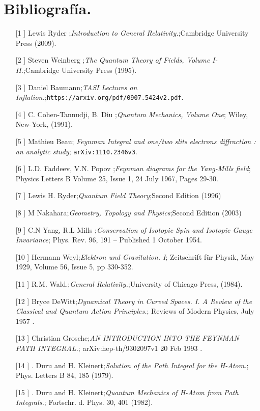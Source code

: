 \chapter*{Bibliografía.}
\begin{itemize}
\item[[1]] Lewis Ryder ;\textit{Introduction to General Relativity.};Cambridge University Press (2009).
\item[[2]] Steven Weinberg ;\textit{The Quantum Theory of Fields, Volume I-II.};Cambridge University Press (1995).
\item[[3]] Daniel Baumann;\textit{TASI Lectures on Inflation.};\texttt{https://arxiv.org/pdf/0907.5424v2.pdf}.
\item[[4]] C. Cohen-Tannudji, B. Diu ;\textit{Quantum Mechanics, Volume One}; Wiley, New-York, (1991).
\item[[5]] Mathieu Beau; \textit{Feynman Integral and one/two slits electrons diffraction : an analytic study}; \texttt{arXiv:1110.2346v3}.
\item[[6]]  L.D. Faddeev,  V.N. Popov ;\textit{Feynman diagrams for the Yang-Mills field}; Physics Letters B Volume 25, Issue 1, 24 July 1967, Pages 29-30.
\item[[7]] Lewis H. Ryder;\textit{Quantum Field Theory};Second Edition (1996) 
\item[[8]] M Nakahara;\textit{Geometry, Topology and Physics};Second Edition (2003) 
\item[[9]]  C.N Yang,  R.L Mills ;\textit{Conservation of Isotopic Spin and Isotopic Gauge Invariance}; Phys. Rev. 96, 191 – Published 1 October 1954.
\item[[10]]  Hermann Weyl;\textit{Elektron und Gravitation. I}; Zeitschrift für Physik, May 1929, Volume 56, Issue 5, pp 330-352.
\item[[11]] R.M. Wald.;\textit{General Relativity.};University of Chicago Press, (1984). 
\item[[12]]  Bryce DeWitt;\textit{Dynamical Theory in Curved Spaces. I. A Review of the Classical and Quantum Action Principles.}; Reviews of Modern Physics, July 1957 .
\item[[13]]  Christian Grosche;\textit{AN INTRODUCTION INTO
THE FEYNMAN PATH INTEGRAL.}; arXiv:hep-th/9302097v1 20 Feb 1993 .
\item[[14]]  . Duru and H. Kleinert;\textit{Solution of the Path Integral for the H-Atom.}; Phys. Letters B 84, 185 (1979).
\item[[15]]  . Duru and H. Kleinert;\textit{Quantum Mechanics of H-Atom from Path Integrals.};  Fortschr. d. Phys. 30, 401 (1982).

\end{itemize}
